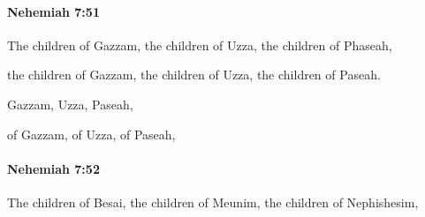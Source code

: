 		\paragraph{Nehemiah 7:51} %
			\label{NEHEMIAH-7-51}

			The children of Gazzam, the children of Uzza, the children of Phaseah,

			\begin{versebox}
					\item[BHS] 
					\item[LXX] 
					\item[ASV] the children of Gazzam, the children of Uzza, the children of Paseah.
					\item[NIV] Gazzam, Uzza, Paseah,
					\item[NRSV] of Gazzam, of Uzza, of Paseah,
			\end{versebox}

		\paragraph{Nehemiah 7:52} %
			\label{NEHEMIAH-7-52}

			The children of Besai, the children of Meunim, the children of Nephishesim,

